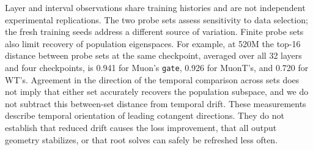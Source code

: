 Layer and interval observations share training histories and are not independent experimental replications. The two probe sets assess sensitivity to data selection; the fresh training seeds address a different source of variation. Finite probe sets also limit recovery of population eigenspaces. For example, at 520M the top-16 distance between probe sets at the same checkpoint, averaged over all 32 layers and four checkpoints, is 0.941 for Muon's \texttt{gate}, 0.926 for MuonT's, and 0.720 for WT's. Agreement in the direction of the temporal comparison across sets does not imply that either set accurately recovers the population subspace, and we do not subtract this between-set distance from temporal drift. These measurements describe temporal orientation of leading cotangent directions. They do not establish that reduced drift causes the loss improvement, that all output geometry stabilizes, or that root solves can safely be refreshed less often.

